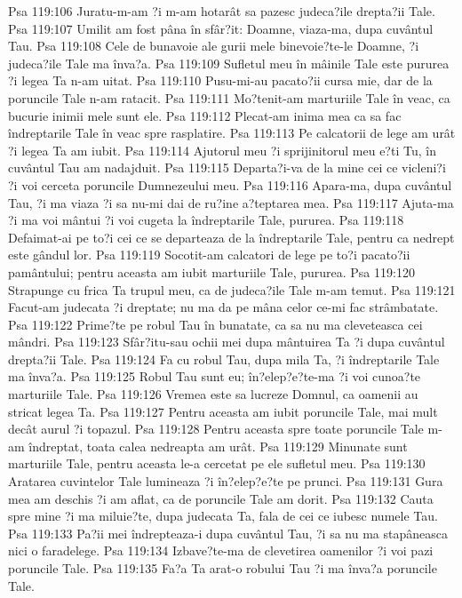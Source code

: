 Psa 119:106  Juratu-m-am ?i m-am hotarât sa pazesc judeca?ile drepta?ii Tale.
Psa 119:107  Umilit am fost pâna în sfâr?it: Doamne, viaza-ma, dupa cuvântul Tau.
Psa 119:108  Cele de bunavoie ale gurii mele binevoie?te-le Doamne, ?i judeca?ile Tale ma înva?a.
Psa 119:109  Sufletul meu în mâinile Tale este pururea ?i legea Ta n-am uitat.
Psa 119:110  Pusu-mi-au pacato?ii cursa mie, dar de la poruncile Tale n-am ratacit.
Psa 119:111  Mo?tenit-am marturiile Tale în veac, ca bucurie inimii mele sunt ele.
Psa 119:112  Plecat-am inima mea ca sa fac îndreptarile Tale în veac spre rasplatire.
Psa 119:113  Pe calcatorii de lege am urât ?i legea Ta am iubit.
Psa 119:114  Ajutorul meu ?i sprijinitorul meu e?ti Tu, în cuvântul Tau am nadajduit.
Psa 119:115  Departa?i-va de la mine cei ce vicleni?i ?i voi cerceta poruncile Dumnezeului meu.
Psa 119:116  Apara-ma, dupa cuvântul Tau, ?i ma viaza ?i sa nu-mi dai de ru?ine a?teptarea mea.
Psa 119:117  Ajuta-ma ?i ma voi mântui ?i voi cugeta la îndreptarile Tale, pururea.
Psa 119:118  Defaimat-ai pe to?i cei ce se departeaza de la îndreptarile Tale, pentru ca nedrept este gândul lor.
Psa 119:119  Socotit-am calcatori de lege pe to?i pacato?ii pamântului; pentru aceasta am iubit marturiile Tale, pururea.
Psa 119:120  Strapunge cu frica Ta trupul meu, ca de judeca?ile Tale m-am temut.
Psa 119:121  Facut-am judecata ?i dreptate; nu ma da pe mâna celor ce-mi fac strâmbatate.
Psa 119:122  Prime?te pe robul Tau în bunatate, ca sa nu ma cleveteasca cei mândri.
Psa 119:123  Sfâr?itu-sau ochii mei dupa mântuirea Ta ?i dupa cuvântul drepta?ii Tale.
Psa 119:124  Fa cu robul Tau, dupa mila Ta, ?i îndreptarile Tale ma înva?a.
Psa 119:125  Robul Tau sunt eu; în?elep?e?te-ma ?i voi cunoa?te marturiile Tale.
Psa 119:126  Vremea este sa lucreze Domnul, ca oamenii au stricat legea Ta.
Psa 119:127  Pentru aceasta am iubit poruncile Tale, mai mult decât aurul ?i topazul.
Psa 119:128  Pentru aceasta spre toate poruncile Tale m-am îndreptat, toata calea nedreapta am urât.
Psa 119:129  Minunate sunt marturiile Tale, pentru aceasta le-a cercetat pe ele sufletul meu.
Psa 119:130  Aratarea cuvintelor Tale lumineaza ?i în?elep?e?te pe prunci.
Psa 119:131  Gura mea am deschis ?i am aflat, ca de poruncile Tale am dorit.
Psa 119:132  Cauta spre mine ?i ma miluie?te, dupa judecata Ta, fala de cei ce iubesc numele Tau.
Psa 119:133  Pa?ii mei îndrepteaza-i dupa cuvântul Tau, ?i sa nu ma stapâneasca nici o faradelege.
Psa 119:134  Izbave?te-ma de clevetirea oamenilor ?i voi pazi poruncile Tale.
Psa 119:135  Fa?a Ta arat-o robului Tau ?i ma înva?a poruncile Tale.
